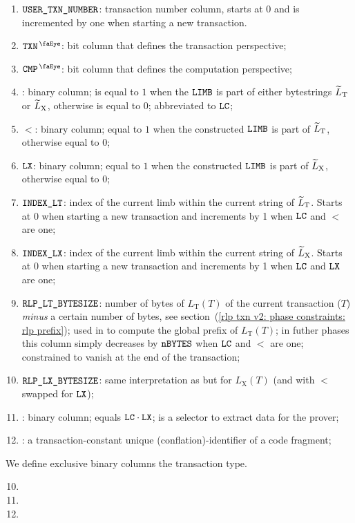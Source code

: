 \begin{enumerate}
    \item $\texttt{USER}\texttt{\_}\texttt{TXN\_NUMBER}$:
	transaction number column, starts at 0 and is incremented by one when starting a new transaction.
    \item $\isTxn$:
	bit column that defines the transaction perspective;
    \item $\isCmp$:
	bit column that defines the computation perspective;
    \item {}:
	binary column;
	is equal to $1$ when the $\texttt{LIMB}$ is part of either \rlp{} bytestrings $\widetilde{L}_{\mathrm{T}}$ or $\widetilde{L}_{\mathrm{X}}$, otherwise is equal to $0$;
	abbreviated to $\texttt{LC}$;
	\item $\lt$:
	binary column; equal to $1$ when the constructed $\texttt{LIMB}$ is part of $\widetilde{L}_{\mathrm{T}}$, otherwise equal to $0$;
    \item $\texttt{LX}$:
	binary column; equal to $1$ when the constructed $\texttt{LIMB}$ is part of $\widetilde{L}_{\mathrm{X}}$, otherwise equal to $0$;
    \item $\texttt{INDEX\_LT}$:
	index of the current limb within the current string of $\widetilde{L}_{\mathrm{T}}$. Starts at 0 when starting a new transaction and increments by 1 when $\texttt{LC}$ and $\lt$ are one; 
    \item $\texttt{INDEX\_LX}$:                                                       
	index of the current limb within the current string of $\widetilde{L}_{\mathrm{X}}$. Starts at 0 when starting a new transaction and increments by 1 when $\texttt{LC}$ and $\texttt{LX}$ are one;
    \item $\texttt{RLP\_LT\_BYTESIZE}$:
	number of bytes of $L_{\mathrm{T}}(T)$ of the current transaction ($T$) \emph{minus} a certain number of bytes,
	see section~(\ref{rlp txn v2: phase constraints: rlp prefix});
	used in \phaseRlpPrefix{} to compute the global \rlp{} prefix of $L_{\mathrm{T}}(T)$;
	in futher phases this column simply decreases by $\texttt{nBYTES}$ when $\texttt{LC}$ and $\lt$ are one;
	constrained to vanish at the end of the transaction;
    \item $\texttt{RLP\_LX\_BYTESIZE}$:
	same interpretation as \rlptsize{} but for $L_{\mathrm{X}}(T)$
	(and with $\lt$ swapped for $\texttt{LX}$);
    \item \toHashByProver{}:
	binary column; equals $\texttt{LC} \cdot \texttt{LX}$; is a selector to extract data for the prover;
	\item \CFI{}:
	a transaction-constant unique (conflation)-identifier of a code fragment;
\end{enumerate}
We define exclusive binary columns the transaction type.
\begin{multicols}{3}
    \begin{enumerate}
	\setcounter{enumi}{9}
	\item \typeZeroTx{}
	\item \typeOneTx{}
	\item \typeTwoTx{}
    \end{enumerate}
\end{multicols}

